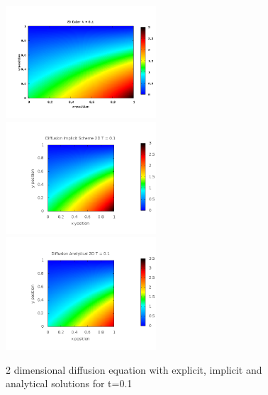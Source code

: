 \documentclass[a4wide,12pt]{article}
\begin{document}
 \begin{figure}[p]
 \includegraphics[width=0.5\textwidth]{euler2d01}
 \includegraphics[width=0.5\textwidth]{Implicit2DT0_1}
 \includegraphics[width=0.5\textwidth]{Analytical2DT0_1}
 \caption{2 dimensional diffusion equation with explicit, implicit and analytical solutions for t=0.1}
 \label{fig:09}
 \end{figure}
 
\end{document}
